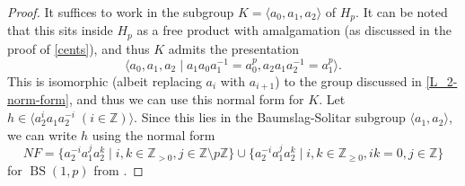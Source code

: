 \documentclass[11pt]{amsart}
\theoremstyle{definition}
\numberwithin{theorem}{section}
\DeclareMathOperator{\BS}{BS}
\newcommand{\Z}{\mathbb{Z}}
\begin{document}
\begin{proof}
	It suffices to work in the subgroup \(K = \langle a_0, a_1, a_2 \rangle\) of
	\(H_p\). It can be noted that this sits inside \(H_p\) as a free product
	with amalgamation (as discussed in the proof of \cref{cents}), and thus
	\(K\) admits the presentation
	\[
		\langle a_0, a_1, a_2 \mid a_1 a_0 a_1^{-1} = a_0^p, a_2 a_1 a_2^{-1}
		= a_1^p \rangle.
	\]
	This is isomorphic (albeit replacing \(a_i\) with \(a_{i + 1}\)) to the
	group discussed in \cref{L_2-norm-form}, and thus we can use this normal
	form for \(K\). Let \(h \in \langle a_2^i a_1 a_2^{-i} \; (i \in \Z)
	\rangle\). Since this lies in the Baumslag-Solitar subgroup
	\(\langle a_1, a_2\rangle\), we can write \(h\) using the normal
	form
	\[
			NF = \{ a_2^{-i} a_1^j a_2^k \mid i, k \in \Z_{> 0}, j \in \Z \setminus p\Z \} 
			\cup \{a_2^{-i} a_1^j a_2^k \mid i, k \in \Z_{\geq 0}, ik = 0, j \in \Z\}
	\]
	for \(\BS(1, p)\) from \cite[Section~2]{BurilloElder}.


\end{proof}
\end{document}
